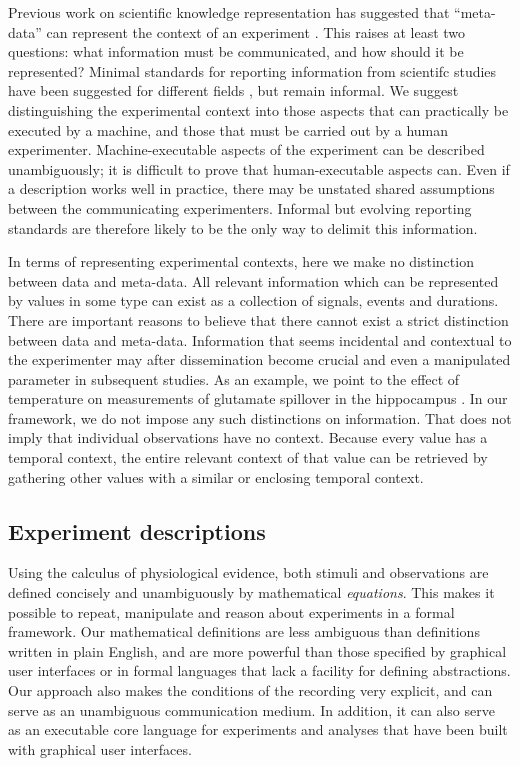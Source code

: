 Previous work on scientific knowledge representation has suggested
that ``meta-data'' can represent the context of an experiment
\citep{Bower2009}. This raises at least two questions: what
information must be communicated, and how should it be represented?
Minimal standards for reporting information from scientifc studies
have been suggested for different fields
\citep{Taylor2007,Gibson2008}, but remain informal. We suggest
distinguishing the experimental context into those aspects that can
practically be executed by a machine, and those that must be carried
out by a human experimenter. Machine-executable aspects of the
experiment can be described unambiguously; it is difficult to prove
that human-executable aspects can. Even if a description works well in
practice, there may be unstated shared assumptions between the
communicating experimenters. Informal but evolving reporting standards
are therefore likely to be the only way to delimit this information.

In terms of representing experimental contexts, here we make no
distinction between data and meta-data. All relevant information which
can be represented by values in some type can exist as a collection of
signals, events and durations. There are important reasons to believe
that there cannot exist a strict distinction between data and
meta-data. Information that seems incidental and contextual to the
experimenter may after dissemination become crucial and even a
manipulated parameter in subsequent studies. As an example, we point
to the effect of temperature on measurements of glutamate spillover in
the hippocampus \citep{Kullmann1996, Asztely1997}.  In our framework,
we do not impose any such distinctions on information. That does not
imply that individual observations have no context. Because every
value has a temporal context, the entire relevant context of that
value can be retrieved by gathering other values with a similar or
enclosing temporal context.

\subsection*{Experiment descriptions}

Using the calculus of physiological evidence, both stimuli and
observations are defined concisely and unambiguously by mathematical
\emph{equations}. This makes it possible to repeat, manipulate and
reason about experiments in a formal framework. Our mathematical
definitions are less ambiguous than definitions written in plain
English, and are more powerful than those specified by graphical user
interfaces or in formal languages that lack a facility for defining
abstractions. Our approach also makes the conditions of the recording
very explicit, and can serve as an unambiguous communication
medium. In addition, it can also serve as an executable core language
for experiments and analyses that have been built with graphical user
interfaces.


